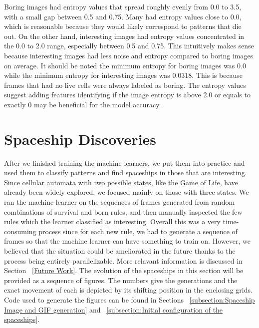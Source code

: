 \documentclass[12pt]{article}
\numberwithin{figure}{section} %
\begin{document}
Boring images had entropy values that spread roughly evenly from 0.0 to 3.5, with a small gap between 0.5 and 0.75. Many had entropy values close to 0.0, which is reasonable because they would likely correspond to patterns that die out. On the other hand, interesting images had entropy values concentrated in the 0.0 to 2.0 range, especially between 0.5 and 0.75. This intuitively makes sense because interesting images had less noise and entropy compared to boring images on average. It should be noted the minimum entropy for boring images was 0.0 while the minimum entropy for interesting images was 0.0318. This is because frames that had no live cells were always labeled as boring. The entropy values suggest adding features identifying if the image entropy is above 2.0 or equals to exactly 0 may be beneficial for the model accuracy. 

\newpage
\section{Spaceship Discoveries}
\label{Spaceship Discoveries}
After we finished training the machine learners, we put them into practice and used them to classify patterns and find spaceships in those that are interesting. Since cellular automata with two possible states, like the Game of Life, have already been widely explored, we focused mainly on those with three states. We ran the machine learner on the sequences of frames generated from random combinations of survival and born rules, and then manually inspected the few rules which the learner classified as interesting. Overall this was a very time-consuming process since for each new rule, we had to generate a sequence of frames so that the machine learner can have something to train on. However, we believed that the situation could be ameliorated in the future thanks to the process being entirely parallelizable. More relavant information is discussed in Section ~\ref{Future Work}. The evolution of the spaceships in this section will be provided as a sequence of figures. The numbers give the generations and the exact movement of each is depicted by its shifting position in the enclosing grids. Code used to generate the figures can be found in Sections ~\ref{subsection:Spaceship Image and GIF generation} and ~\ref{subsection:Initial configuration of the spaceships}. 
\end{document}
